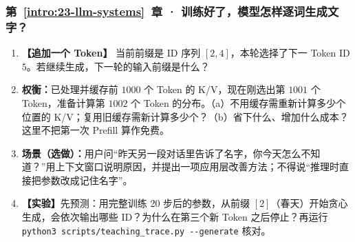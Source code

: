 \subsubsection*{第~\ref*{intro:23-llm-systems}~章 · 训练好了，模型怎样逐词生成文字？}
\begin{enumerate}[label={},leftmargin=4.8em,itemsep=4pt]
\item[\textbf{C-085.}] \leavevmode{}\label{exercise:C-085}\label{exercise:generation-prefix-append}\textbf{【追加一个 Token】} 当前前缀是 ID 序列 $[2,4]$，本轮选择了下一 Token ID $5$。若继续生成，下一轮的输入前缀是什么？
\item[\textbf{C-086.}] \leavevmode{}\label{exercise:C-086}\label{exercise:cached-next-token}\textbf{权衡：}已处理并缓存前 $1000$ 个 Token 的 K/V，现在刚选出第 $1001$ 个 Token，准备计算第 $1002$ 个 Token 的分布。（a）不用缓存需重新计算多少个位置的 K/V；复用旧缓存需新计算多少个？（b）省下什么、增加什么成本？这里不把第一次 Prefill 算作免费。
\item[\textbf{C-087.}] \leavevmode{}\label{exercise:C-087}\label{exercise:context-window-memory}\textbf{场景（选做）：}用户问“昨天另一段对话里告诉了名字，你今天怎么不知道？”用上下文窗口说明原因，并提出一项应用层改善方法；不得说“推理时直接把参数改成记住名字”。
\item[\textbf{C-088.}] \leavevmode{}\label{exercise:C-088}\label{exercise:greedy-generation}\textbf{【实验】}先预测：用完整训练 20 步后的参数，从前缀 $[2]$（春天）开始贪心生成，会依次输出哪些 ID？为什么在第三个新 Token 之后停止？再运行 \texttt{python3 scripts/teaching\_trace.py -{}-generate} 核对。
\end{enumerate}
